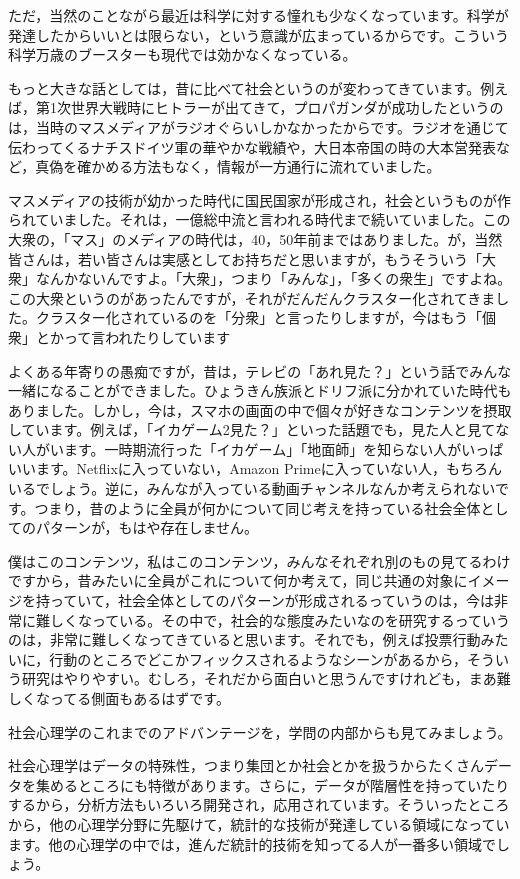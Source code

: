 \documentclass{ltjsbook}
\begin{document}
ただ，当然のことながら最近は科学に対する憧れも少なくなっています。科学が発達したからいいとは限らない，という意識が広まっているからです。こういう科学万歳のブースターも現代では効かなくなっている。

もっと大きな話としては，昔に比べて社会というのが変わってきています。例えば，第1次世界大戦時にヒトラーが出てきて，プロパガンダが成功したというのは，当時のマスメディアがラジオぐらいしかなかったからです。ラジオを通じて伝わってくるナチスドイツ軍の華やかな戦績や，大日本帝国の時の大本営発表など，真偽を確かめる方法もなく，情報が一方通行に流れていました。

マスメディアの技術が幼かった時代に国民国家が形成され，社会というものが作られていました。それは，一億総中流と言われる時代まで続いていました。この大衆の，「マス」のメディアの時代は，40，50年前まではありました。が，当然皆さんは，若い皆さんは実感としてお持ちだと思いますが，もうそういう「大衆」なんかないんですよ。「大衆」，つまり「みんな」，「多くの衆生」ですよね。この大衆というのがあったんですが，それがだんだんクラスター化されてきました。クラスター化されているのを「分衆」と言ったりしますが，今はもう「個衆」とかって言われたりしています

よくある年寄りの愚痴ですが，昔は，テレビの「あれ見た？」という話でみんな一緒になることができました。ひょうきん族派とドリフ派に分かれていた時代もありました。しかし，今は，スマホの画面の中で個々が好きなコンテンツを摂取しています。例えば，「イカゲーム2見た？」といった話題でも，見た人と見てない人がいます。一時期流行った「イカゲーム」「地面師」を知らない人がいっぱいいます。Netflixに入っていない，Amazon Primeに入っていない人，もちろんいるでしょう。逆に，みんなが入っている動画チャンネルなんか考えられないです。つまり，昔のように全員が何かについて同じ考えを持っている社会全体としてのパターンが，もはや存在しません。

僕はこのコンテンツ，私はこのコンテンツ，みんなそれぞれ別のもの見てるわけですから，昔みたいに全員がこれについて何か考えて，同じ共通の対象にイメージを持っていて，社会全体としてのパターンが形成されるっていうのは，今は非常に難しくなっている。その中で，社会的な態度みたいなのを研究するっていうのは，非常に難しくなってきていると思います。それでも，例えば投票行動みたいに，行動のところでどこかフィックスされるようなシーンがあるから，そういう研究はやりやすい。むしろ，それだから面白いと思うんですけれども，まあ難しくなってる側面もあるはずです。

社会心理学のこれまでのアドバンテージを，学問の内部からも見てみましょう。

社会心理学はデータの特殊性，つまり集団とか社会とかを扱うからたくさんデータを集めるところにも特徴があります。さらに，データが階層性を持っていたりするから，分析方法もいろいろ開発され，応用されています。そういったところから，他の心理学分野に先駆けて，統計的な技術が発達している領域になっています。他の心理学の中では，進んだ統計的技術を知ってる人が一番多い領域でしょう。
\end{document}
